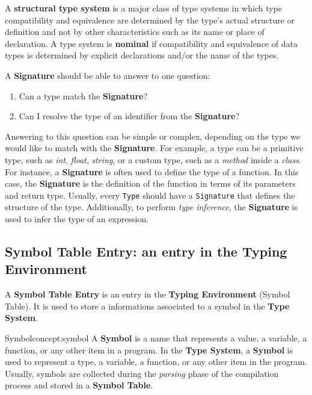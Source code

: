 A \textbf{structural type system} is a major class of type systems in which type compatibility and equivalence are determined by the type's actual structure or definition and not by other characteristics such as its name or place of declaration. A type system is \textbf{nominal} if compatibility and equivalence of data types is determined by explicit declarations and/or the name of the types.

A \textbf{Signature} should be able to answer to one question:

\begin{enumerate}
    \item Can a type match the \textbf{Signature}?
    \item Can I resolve the type of an identifier from the \textbf{Signature}?
\end{enumerate}

Answering to this question can be simple or complex, depending on the type we would like to match with the \textbf{Signature}. For example, a type can be a primitive type, such as \textit{int}, \textit{float}, \textit{string}, or a custom type, such as a \textit{method} inside a \textit{class}.
For instance, a \textbf{Signature} is often used to define the type of a function. In this case, the \textbf{Signature} is the definition of the function in terms of its parameters and return type.
Usually, every \texttt{Type} should have a \texttt{Signature} that defines the structure of the type.
Additionally, to perform \textit{type inference}, the \textbf{Signature} is used to infer the type of an expression.

\subsection{Symbol Table Entry: an entry in the Typing Environment}\label{subsec:concept:SymbolTableEntryAnEntryInTheTypingEnvironment}

A \textbf{Symbol Table Entry} is an entry in the \textbf{Typing Environment} (Symbol Table). It is used to store a informations associated to a symbol in the \textbf{Type System}.

\begin{mydefinition}{Symbol}{concept:symbol}
    A \textbf{Symbol} is a name that represents a value, a variable, a function, or any other item in a program. In the \textbf{Type System}, a \textbf{Symbol} is used to represent a type, a variable, a function, or any other item in the program.
    Usually, symbols are collected during the \textit{parsing} phase of the compilation process and stored in a \textbf{Symbol Table}.

\end{mydefinition}



